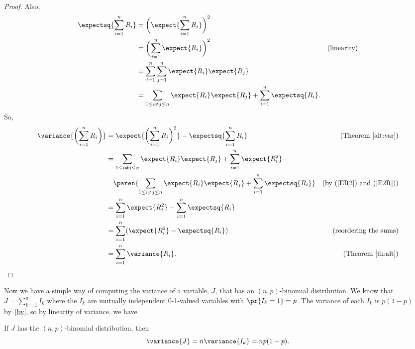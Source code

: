 \begin{proof}
Also,
\begin{align}
\expectsq{\sum_{i=1}^n R_i} & = \biggl(\expect{\sum_{i=1}^n R_i}\biggr)^2 \notag\\
  &  = \biggl(\sum_{i=1}^n \expect{R_i}\biggr)^2 &\text{(linearity)} \notag\\
  &  = \sum_{i=1}^n \sum_{j=1}^n \expect{R_i} \expect{R_j}\notag\\
  & = \sum_{1\le i \neq j \le n} \expect{R_i}\expect{R_j} + \sum_{i=1}^n
     \expectsq{R_i}.\label{E2R}
\end{align}
So,
\begin{align*}
\variance{\biggl(\sum_{i=1}^n R_i\biggr)}
   & =  \expect{\biggl(\sum_{i=1}^n R_i\biggr)^2} -
\expectsq{\sum_{i=1}^n R_i}  & \text{(Theorem~\ref{alt:var})}\\
   &  = \sum_{1\le i \neq j \le n} \expect{R_i} \expect{R_j}
        + \sum_{i=1}^n \expect{R_i^2} - \\
   & \quad \paren{\sum_{1\le i \neq j \le n} \expect{R_i}\expect{R_j}
        + \sum_{i=1}^n \expectsq{R_i}}
      & \text{(by~(\ref{ER2}) and~(\ref{E2R}))}\\
   & = \sum_{i=1}^n \expect{R_i^2} - \sum_{i=1}^n \expectsq{R_i}\\
   & = \sum_{i=1}^n (\expect{R_i^2} - \expectsq{R_i})
             & \text{(reordering the sums)}\\
   & = \sum_{i=1}^n \variance{R_i}. & \text{(Theorem~\ref{th:alt})}
\end{align*}
\fi

\end{proof}

Now we have a simple way of computing the variance of a variable, $J$,
that has an $(n,p)$-binomial distribution.  We know that $J =
\sum_{k=1}^n I_k$ where the $I_k$ are mutually independent 0-1-valued
variables with $\pr{I_k=1}=p$.  The variance of each $I_k$ is $p(1-p)$
by~\eqref{bv}, so by linearity of variance, we have
\begin{lemma*}
If $J$ has the $(n,p)$-binomial distribution, then
\begin{equation}\label{p1p}
\variance{J} = n \variance{I_k} = np(1-p).
\end{equation}
\end{lemma*}


